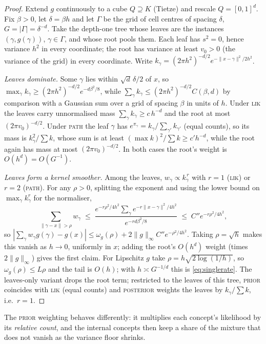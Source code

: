 \documentclass[11pt]{article}
\theoremstyle{definition}
\theoremstyle{remark}
\begin{document}
\begin{proof}
Extend $g$ continuously to a cube $Q\supseteq K$ (Tietze) and rescale $Q=[0,1]^d$.
Fix $\beta>0$, let $\delta=\beta h$ and let $\Gamma$ be the grid of cell centres of
spacing $\delta$, $G=|\Gamma|=\delta^{-d}$.  Take the depth-one tree whose leaves are
the instances $(\gamma,g(\gamma))$, $\gamma\in\Gamma$, and whose root pools them.  Each
leaf has $s^2=0$, hence variance $h^2$ in every coordinate; the root has variance at
least $v_0>0$ (the variance of the grid) in every coordinate.  Write
$k_\gamma=(2\pi h^2)^{-d/2}e^{-\|x-\gamma\|^2/2h^2}$.

\emph{Leaves dominate.}  Some $\gamma$ lies within $\sqrt d\,\delta/2$ of $x$, so
$\max_\gamma k_\gamma\ge(2\pi h^2)^{-d/2}e^{-d\beta^2/8}$, while
$\sum_\gamma k_\gamma\le(2\pi h^2)^{-d/2}C(\beta,d)$ by comparison with a Gaussian sum
over a grid of spacing $\beta$ in units of $h$.  Under \textsc{lik} the leaves carry
unnormalised mass $\sum_\gamma k_\gamma\ge c\,h^{-d}$ and the root at most
$(2\pi v_0)^{-d/2}$.  Under \textsc{path} the leaf $\gamma$ has
$e^{\pi_\gamma}=k_\gamma/\sum_{\gamma'}k_{\gamma'}$ (equal counts), so its mass is
$k_\gamma^2/\sum k$, whose sum is at least $(\max k)^2/\sum k\ge c'h^{-d}$, while the root
again has mass at most $(2\pi v_0)^{-d/2}$.  In both cases the root's weight is
$O(h^d)=O(G^{-1})$.

\emph{Leaves form a kernel smoother.}  Among the leaves, $w_\gamma\propto k_\gamma^{\,r}$
with $r=1$ (\textsc{lik}) or $r=2$ (\textsc{path}).  For any $\rho>0$, splitting the
exponent and using the lower bound on $\max_\gamma k_\gamma^r$ for the normaliser,
\[
\sum_{\|\gamma-x\|>\rho}w_\gamma\;\le\;
\frac{e^{-r\rho^2/4h^2}\sum_\gamma e^{-r\|x-\gamma\|^2/4h^2}}{e^{-rd\beta^2/8}}
\;\le\;C''e^{-r\rho^2/4h^2},
\]
so $|\sum_\gamma w_\gamma g(\gamma)-g(x)|\le\omega_g(\rho)+2\|g\|_\infty C''e^{-\rho^2/4h^2}$.
Taking $\rho=\sqrt h$ makes this vanish as $h\to0$, uniformly in $x$; adding the root's
$O(h^d)$ weight (times $2\|g\|_\infty$) gives the first claim.  For Lipschitz $g$ take
$\rho=h\sqrt{2\log(1/h)}$, so $\omega_g(\rho)\le L\rho$ and the tail is $O(h)$; with
$h\asymp G^{-1/d}$ this is \eqref{eq:singlerate}.  The leaves-only
variant drops the root term; restricted to the leaves of this tree, \textsc{prior}
coincides with \textsc{lik} (equal counts) and \textsc{posterior} weights the leaves by
$k_\gamma/\sum k$, i.e.\ $r=1$.
\end{proof}

The \textsc{prior} weighting behaves differently: it multiplies each concept's
likelihood by its \emph{relative count}, and the internal concepts then keep a share of
the mixture that does not vanish as the variance floor shrinks.
\end{document}
